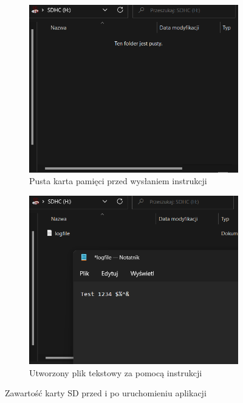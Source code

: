 \documentclass[11pt, a4paper]{article}
\begin{document}
\begin{figure}[h!]
\centering
\begin{subfigure}{.5\textwidth}
  \centering
  \includegraphics[width=1\linewidth]{fig/SD/działanie_ukladu/przed.png}
  \caption{Pusta karta pamięci przed wysłaniem instrukcji}
  \label{fig:sub1}
\end{subfigure}%
\begin{subfigure}{.5\textwidth}
  \centering
  \includegraphics[width=1\linewidth]{fig/SD/działanie_ukladu/po.png}
  \caption{Utworzony plik tekstowy za pomocą instrukcji}
  \label{fig:sub2}
\end{subfigure}
\caption{Zawartość karty SD przed i po uruchomieniu aplikacji}
\label{fig:test}
\end{figure}
\newpage
\printbibliography[heading=bibintoc]
\end{document}
